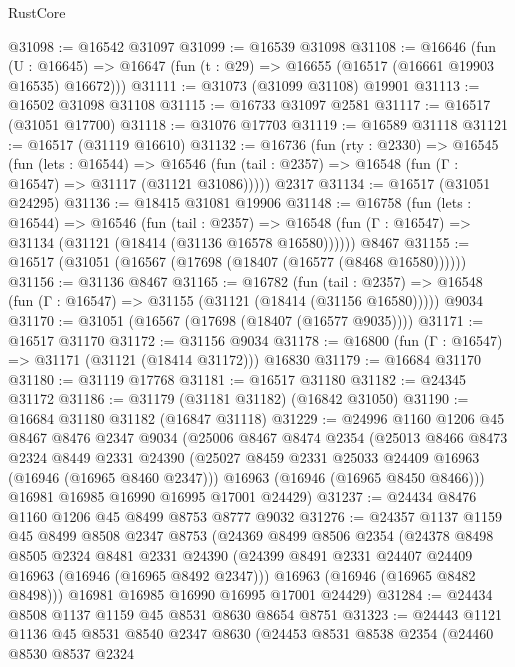 \begin{lexlean}{RustCore}
\begin{coremodule}
@31098 := @16542 @31097
@31099 := @16539 @31098
@31108 := @16646
    (fun (U : @16645) => @16647 (fun (t : @29) => @16655 (@16517 (@16661 @19903 @16535) @16672)))
@31111 := @31073 (@31099 @31108) @19901
@31113 := @16502 @31098 @31108
@31115 := @16733 @31097 @2581
@31117 := @16517 (@31051 @17700)
@31118 := @31076 @17703
@31119 := @16589 @31118
@31121 := @16517 (@31119 @16610)
@31132 := @16736
    (fun (rty : @2330) =>
    @16545
      (fun (lets : @16544) =>
      @16546 (fun (tail : @2357) => @16548 (fun (Γ : @16547) => @31117 (@31121 @31086)))))
    @2317
@31134 := @16517 (@31051 @24295)
@31136 := @18415 @31081 @19906
@31148 := @16758
    (fun (lets : @16544) =>
    @16546
      (fun (tail : @2357) =>
      @16548 (fun (Γ : @16547) => @31134 (@31121 (@18414 (@31136 @16578 @16580))))))
    @8467
@31155 := @16517 (@31051 (@16567 (@17698 (@18407 (@16577 (@8468 @16580))))))
@31156 := @31136 @8467
@31165 := @16782
    (fun (tail : @2357) => @16548 (fun (Γ : @16547) => @31155 (@31121 (@18414 (@31156 @16580)))))
    @9034
@31170 := @31051 (@16567 (@17698 (@18407 (@16577 @9035))))
@31171 := @16517 @31170
@31172 := @31156 @9034
@31178 := @16800 (fun (Γ : @16547) => @31171 (@31121 (@18414 @31172))) @16830
@31179 := @16684 @31170
@31180 := @31119 @17768
@31181 := @16517 @31180
@31182 := @24345 @31172
@31186 := @31179 (@31181 @31182) (@16842 @31050)
@31190 := @16684 @31180 @31182 (@16847 @31118)
@31229 := @24996
    @1160
    @1206
    @45
    @8467
    @8476
    @2347
    @9034
    (@25006
      @8467
      @8474
      @2354
      (@25013
        @8466
        @8473
        @2324
        @8449
        @2331
        @24390
        (@25027 @8459 @2331 @25033 @24409 @16963 (@16946 (@16965 @8460 @2347)))
        @16963
        (@16946 (@16965 @8450 @8466)))
      @16981
      @16985
      @16990
      @16995
      @17001
      @24429)
@31237 := @24434 @8476 @1160 @1206 @45 @8499 @8753 @8777 @9032
@31276 := @24357
    @1137
    @1159
    @45
    @8499
    @8508
    @2347
    @8753
    (@24369
      @8499
      @8506
      @2354
      (@24378
        @8498
        @8505
        @2324
        @8481
        @2331
        @24390
        (@24399 @8491 @2331 @24407 @24409 @16963 (@16946 (@16965 @8492 @2347)))
        @16963
        (@16946 (@16965 @8482 @8498)))
      @16981
      @16985
      @16990
      @16995
      @17001
      @24429)
@31284 := @24434 @8508 @1137 @1159 @45 @8531 @8630 @8654 @8751
@31323 := @24443
    @1121
    @1136
    @45
    @8531
    @8540
    @2347
    @8630
    (@24453
      @8531
      @8538
      @2354
      (@24460
        @8530
        @8537
        @2324

\end{coremodule}
\end{lexlean}
